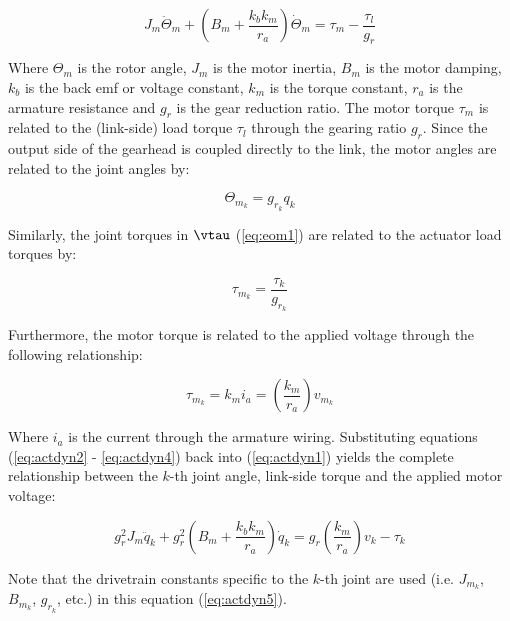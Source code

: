 \begin{equation}
	{J_m}{\ddot \Theta _m} + \left( {{B_m} + \frac{{{k_b}{k_m}}}{{{r_a}}}} \right)\dot \Theta _m  = {\tau _m} - \frac{{{\tau _l}}}{{{g_r}}}
	\label{eq:actdyn1}
\end{equation}

Where $\Theta _m$ is the rotor angle, $J_m$ is the motor inertia, $B_m$ is the motor damping, $k_b$ is the back emf or voltage constant, $k_m$ is the torque constant, $r_a$ is the armature resistance and $g_r$ is the gear reduction ratio. The motor torque $\tau _m$ is related to the (link-side) load torque $\tau _l$ through the gearing ratio $g_r$. Since the output side of the gearhead is coupled directly to the link, the motor angles are related to the joint angles by: 

\begin{equation}
	{\Theta _{m_k}} = {g _{r_k}} {q _k}
	\label{eq:actdyn2} 
\end{equation}

Similarly, the joint torques in $\vtau$ (\ref{eq:eom1}) are related to the actuator load torques by: 

\begin{equation}
	{\tau _{m_k}} = {\frac{\tau _{k}}{g _{r_k}}} 
	\label{eq:actdyn3}
\end{equation}

Furthermore, the motor torque is related to the applied voltage through the following relationship: 

\begin{equation}
	{\tau _{m_k}} = {k_m} {i_a} = \left( {\frac{{{k_m}}}{{{r_a}}}} \right){v _{m_k}}
	\label{eq:actdyn4}
\end{equation}


Where $i_a$ is the current through the armature wiring. Substituting equations (\ref{eq:actdyn2} - \ref{eq:actdyn4}) back into (\ref{eq:actdyn1}) yields the complete relationship between the $k$-th joint angle, link-side torque and the applied motor voltage:

\begin{equation}
	g_r^2{J_m}{\ddot q_k} + g_r^2\left( {{B_m} + \frac{{{k_b}{k_m}}}{{{r_a}}}} \right){\dot q_k} = g_r^{}\left( {\frac{{{k_m}}}{{{r_a}}}} \right){v_k} - {\tau _k}
	\label{eq:actdyn5}
\end{equation}

Note that the drivetrain constants specific to the $k$-th joint are used (i.e. ${J _{m_k}}$, ${B _{m_k}}$, $g _{r_k}$, etc.) in this equation (\ref{eq:actdyn5}). 

